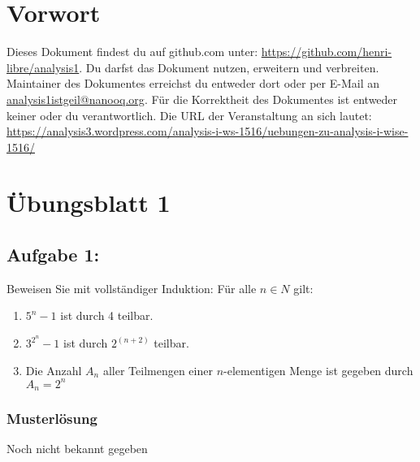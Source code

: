 \documentclass[12pt,a4paper]{report}
\begin{document}
	\chapter{Vorwort}
	Dieses Dokument findest du auf github.com unter: \href{https://github.com/henri-libre/analysis1}{https://github.com/henri-libre/analysis1}. Du darfst das Dokument nutzen, erweitern und verbreiten. Maintainer des Dokumentes erreichst du entweder dort oder per E-Mail an \href{analysis1istgeil@nanooq.org}{analysis1istgeil@nanooq.org}. Für die Korrektheit des Dokumentes ist entweder keiner oder du verantwortlich. Die URL der Veranstaltung an sich lautet: \href{https://analysis3.wordpress.com/analysis-i-ws-1516/uebungen-zu-analysis-i-wise-1516/}{https://analysis3.wordpress.com/analysis-i-ws-1516/uebungen-zu-analysis-i-wise-1516/}
	
\chapter{Übungsblatt 1}
	
	\section{Aufgabe 1:}
	Beweisen Sie mit vollständiger Induktion: Für alle $ n \in N $ gilt:
	\begin{enumerate}
	\item $ 5^n - 1 $ ist durch 4 teilbar.
	\item $ 3^{2^n} - 1 $ ist durch $ 2^(n+2)$ teilbar.
	\item Die Anzahl $A_n$ aller Teilmengen einer $n$-elementigen Menge ist gegeben durch $A_n=2^n$
	\end{enumerate}
	
	\subsection{Musterlösung}
	Noch nicht bekannt gegeben
	
\end{document}
